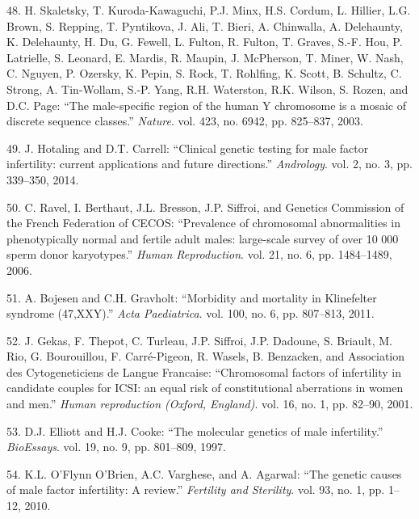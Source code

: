 \documentclass[12pt,twoside]{reedthesis}
\theoremstyle{definition}
\theoremstyle{definition}
\theoremstyle{remark}
\begin{document}
  \hypertarget{ref-Skaletsky2003}{}
  48. H. Skaletsky, T. Kuroda-Kawaguchi, P.J. Minx, H.S. Cordum, L.
  Hillier, L.G. Brown, S. Repping, T. Pyntikova, J. Ali, T. Bieri, A.
  Chinwalla, A. Delehaunty, K. Delehaunty, H. Du, G. Fewell, L. Fulton, R.
  Fulton, T. Graves, S.-F. Hou, P. Latrielle, S. Leonard, E. Mardis, R.
  Maupin, J. McPherson, T. Miner, W. Nash, C. Nguyen, P. Ozersky, K.
  Pepin, S. Rock, T. Rohlfing, K. Scott, B. Schultz, C. Strong, A.
  Tin-Wollam, S.-P. Yang, R.H. Waterston, R.K. Wilson, S. Rozen, and D.C.
  Page: ``The male-specific region of the human Y chromosome is a mosaic
  of discrete sequence classes.'' \emph{Nature}. vol. 423, no. 6942, pp.
  825--837, 2003.
  
  \hypertarget{ref-Hotaling2014}{}
  49. J. Hotaling and D.T. Carrell: ``Clinical genetic testing for male
  factor infertility: current applications and future directions.''
  \emph{Andrology}. vol. 2, no. 3, pp. 339--350, 2014.
  
  \hypertarget{ref-Ravel2006}{}
  50. C. Ravel, I. Berthaut, J.L. Bresson, J.P. Siffroi, and Genetics
  Commission of the French Federation of CECOS: ``Prevalence of
  chromosomal abnormalities in phenotypically normal and fertile adult
  males: large-scale survey of over 10 000 sperm donor karyotypes.''
  \emph{Human Reproduction}. vol. 21, no. 6, pp. 1484--1489, 2006.
  
  \hypertarget{ref-Bojesen2011}{}
  51. A. Bojesen and C.H. Gravholt: ``Morbidity and mortality in
  Klinefelter syndrome (47,XXY).'' \emph{Acta Paediatrica}. vol. 100, no.
  6, pp. 807--813, 2011.
  
  \hypertarget{ref-Gekas2001}{}
  52. J. Gekas, F. Thepot, C. Turleau, J.P. Siffroi, J.P. Dadoune, S.
  Briault, M. Rio, G. Bourouillou, F. Carré-Pigeon, R. Wasels, B.
  Benzacken, and Association des Cytogeneticiens de Langue Francaise:
  ``Chromosomal factors of infertility in candidate couples for ICSI: an
  equal risk of constitutional aberrations in women and men.'' \emph{Human
  reproduction (Oxford, England)}. vol. 16, no. 1, pp. 82--90, 2001.
  
  \hypertarget{ref-Elliott1997}{}
  53. D.J. Elliott and H.J. Cooke: ``The molecular genetics of male
  infertility.'' \emph{BioEssays}. vol. 19, no. 9, pp. 801--809, 1997.
  
  \hypertarget{ref-OFlynnOBrien2010}{}
  54. K.L. O'Flynn O'Brien, A.C. Varghese, and A. Agarwal: ``The genetic
  causes of male factor infertility: A review.'' \emph{Fertility and
  Sterility}. vol. 93, no. 1, pp. 1--12, 2010.
  
\end{document}
